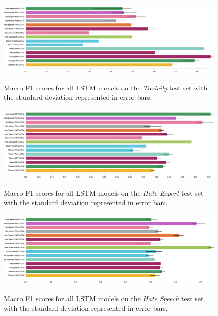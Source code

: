 \begin{figure}
\begin{minipage}{\textwidth}
    \centering
    \includegraphics[width=\textwidth]{all_lstm_wulczyn_test.pdf}
    \caption{Macro F1 scores for all LSTM models on the \textit{Toxicity} test set with the standard deviation represented in error bars.}
    \label{fig:wulczyn_lstm_test}
  \vfill
    \includegraphics[width=\textwidth]{all_lstm_waseem_test.pdf}
    \caption{Macro F1 scores for all LSTM models on the \textit{Hate Expert} test set with the standard deviation represented in error bars.}
    \label{fig:waseem_lstm_test}
    \vfill
    \includegraphics[width=\textwidth]{all_lstm_waseem_hovy_test.pdf}
    \caption{Macro F1 scores for all LSTM models on the \textit{Hate Speech} test set with the standard deviation represented in error bars.}
  \label{fig:waseem_hovy_lstm_test}  
\end{minipage}
\end{figure}

